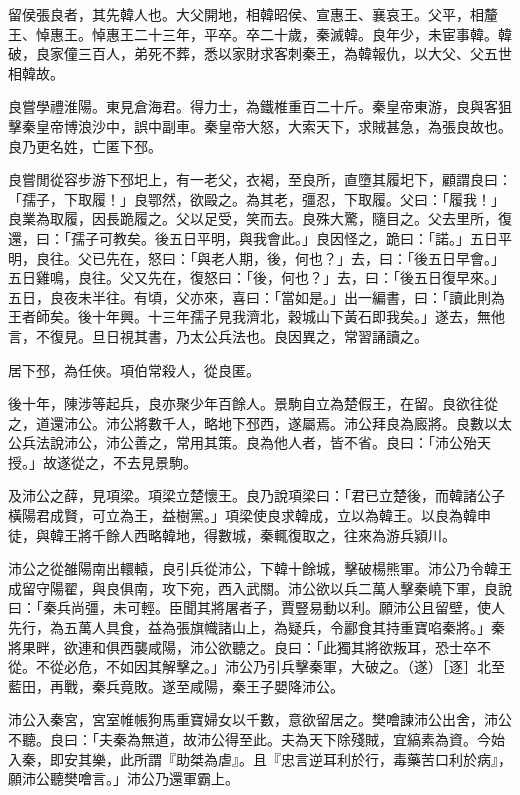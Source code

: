 
\begin{pinyinscope}
留侯張良者，其先韓人也。大父開地，相韓昭侯、宣惠王、襄哀王。父平，相釐王、悼惠王。悼惠王二十三年，平卒。卒二十歲，秦滅韓。良年少，未宦事韓。韓破，良家僮三百人，弟死不葬，悉以家財求客刺秦王，為韓報仇，以大父、父五世相韓故。

良嘗學禮淮陽。東見倉海君。得力士，為鐵椎重百二十斤。秦皇帝東游，良與客狙擊秦皇帝博浪沙中，誤中副車。秦皇帝大怒，大索天下，求賊甚急，為張良故也。良乃更名姓，亡匿下邳。

良嘗閒從容步游下邳圯上，有一老父，衣褐，至良所，直墮其履圯下，顧謂良曰：「孺子，下取履！」良鄂然，欲毆之。為其老，彊忍，下取履。父曰：「履我！」良業為取履，因長跪履之。父以足受，笑而去。良殊大驚，隨目之。父去里所，復還，曰：「孺子可教矣。後五日平明，與我會此。」良因怪之，跪曰：「諾。」五日平明，良往。父已先在，怒曰：「與老人期，後，何也？」去，曰：「後五日早會。」五日雞鳴，良往。父又先在，復怒曰：「後，何也？」去，曰：「後五日復早來。」五日，良夜未半往。有頃，父亦來，喜曰：「當如是。」出一編書，曰：「讀此則為王者師矣。後十年興。十三年孺子見我濟北，穀城山下黃石即我矣。」遂去，無他言，不復見。旦日視其書，乃太公兵法也。良因異之，常習誦讀之。

居下邳，為任俠。項伯常殺人，從良匿。

後十年，陳涉等起兵，良亦聚少年百餘人。景駒自立為楚假王，在留。良欲往從之，道還沛公。沛公將數千人，略地下邳西，遂屬焉。沛公拜良為廄將。良數以太公兵法說沛公，沛公善之，常用其策。良為他人者，皆不省。良曰：「沛公殆天授。」故遂從之，不去見景駒。

及沛公之薛，見項梁。項梁立楚懷王。良乃說項梁曰：「君已立楚後，而韓諸公子橫陽君成賢，可立為王，益樹黨。」項梁使良求韓成，立以為韓王。以良為韓申徒，與韓王將千餘人西略韓地，得數城，秦輒復取之，往來為游兵潁川。

沛公之從雒陽南出轘轅，良引兵從沛公，下韓十餘城，擊破楊熊軍。沛公乃令韓王成留守陽翟，與良俱南，攻下宛，西入武關。沛公欲以兵二萬人擊秦嶢下軍，良說曰：「秦兵尚彊，未可輕。臣聞其將屠者子，賈豎易動以利。願沛公且留壁，使人先行，為五萬人具食，益為張旗幟諸山上，為疑兵，令酈食其持重寶啗秦將。」秦將果畔，欲連和俱西襲咸陽，沛公欲聽之。良曰：「此獨其將欲叛耳，恐士卒不從。不從必危，不如因其解擊之。」沛公乃引兵擊秦軍，大破之。（遂）［逐］北至藍田，再戰，秦兵竟敗。遂至咸陽，秦王子嬰降沛公。

沛公入秦宮，宮室帷帳狗馬重寶婦女以千數，意欲留居之。樊噲諫沛公出舍，沛公不聽。良曰：「夫秦為無道，故沛公得至此。夫為天下除殘賊，宜縞素為資。今始入秦，即安其樂，此所謂『助桀為虐』。且『忠言逆耳利於行，毒藥苦口利於病』，願沛公聽樊噲言。」沛公乃還軍霸上。


\end{pinyinscope}
